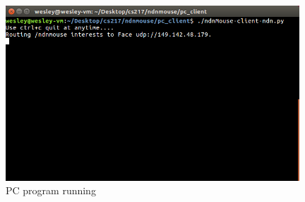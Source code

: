\documentclass{sig-alternate}
\renewcommand\_{\textunderscore\allowbreak}  %
\begin{document}
\begin{figure}[hp]
	\hypertarget{fig:client3}{}
	\centering
	\includegraphics[width=11cm]{screenshots/client3}
	\caption{PC program running}
\end{figure}
\end{document}
